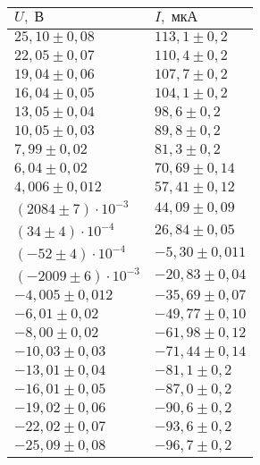 \begin{tabular}{|l|l|}
\hline
$U,\;\text{В}$ & $I,\;\text{мкА}$\\\hline
$25{,}10 \pm 0{,}08$ & $113{,}1 \pm 0{,}2$\\\hline
$22{,}05 \pm 0{,}07$ & $110{,}4 \pm 0{,}2$\\\hline
$19{,}04 \pm 0{,}06$ & $107{,}7 \pm 0{,}2$\\\hline
$16{,}04 \pm 0{,}05$ & $104{,}1 \pm 0{,}2$\\\hline
$13{,}05 \pm 0{,}04$ & $98{,}6 \pm 0{,}2$\\\hline
$10{,}05 \pm 0{,}03$ & $89{,}8 \pm 0{,}2$\\\hline
$7{,}99 \pm 0{,}02$ & $81{,}3 \pm 0{,}2$\\\hline
$6{,}04 \pm 0{,}02$ & $70{,}69 \pm 0{,}14$\\\hline
$4{,}006 \pm 0{,}012$ & $57{,}41 \pm 0{,}12$\\\hline
$\left(2084 \pm 7\right)\cdot 10^{-3}$ & $44{,}09 \pm 0{,}09$\\\hline
$\left(34 \pm 4\right)\cdot 10^{-4}$ & $26{,}84 \pm 0{,}05$\\\hline
$\left(-52 \pm 4\right)\cdot 10^{-4}$ & $-5{,}30 \pm 0{,}011$\\\hline
$\left(-2009 \pm 6\right)\cdot 10^{-3}$ & $-20{,}83 \pm 0{,}04$\\\hline
$-4{,}005 \pm 0{,}012$ & $-35{,}69 \pm 0{,}07$\\\hline
$-6{,}01 \pm 0{,}02$ & $-49{,}77 \pm 0{,}10$\\\hline
$-8{,}00 \pm 0{,}02$ & $-61{,}98 \pm 0{,}12$\\\hline
$-10{,}03 \pm 0{,}03$ & $-71{,}44 \pm 0{,}14$\\\hline
$-13{,}01 \pm 0{,}04$ & $-81{,}1 \pm 0{,}2$\\\hline
$-16{,}01 \pm 0{,}05$ & $-87{,}0 \pm 0{,}2$\\\hline
$-19{,}02 \pm 0{,}06$ & $-90{,}6 \pm 0{,}2$\\\hline
$-22{,}02 \pm 0{,}07$ & $-93{,}6 \pm 0{,}2$\\\hline
$-25{,}09 \pm 0{,}08$ & $-96{,}7 \pm 0{,}2$\\\hline
\end{tabular}
